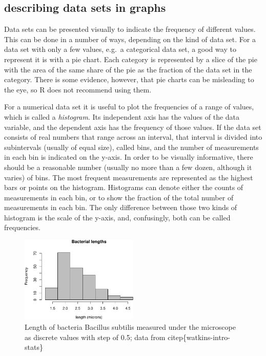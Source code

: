 \documentclass[
  letterpaper,
  DIV=11,
  numbers=noendperiod]{scrreprt}
\begin{document}
\hypertarget{describing-data-sets-in-graphs}{%
\subsection{describing data sets in
graphs}\label{describing-data-sets-in-graphs}}

Data sets can be presented visually to indicate the frequency of
different values. This can be done in a number of ways, depending on the
kind of data set. For a data set with only a few values, e.g.~a
categorical data set, a good way to represent it is with a pie chart.
Each category is represented by a slice of the pie with the area of the
same share of the pie as the fraction of the data set in the category.
There is some evidence, however, that pie charts can be misleading to
the eye, so R does not recommend using them.

For a numerical data set it is useful to plot the frequencies of a range
of values, which is called a 
\emph{histogram}. Its independent axis has the values of the data
variable, and the dependent axis has the frequency of those values. If
the data set consists of real numbers that range across an interval,
that interval is divided into subintervals (usually of equal size),
called bins, and the number of measurements in each bin is indicated on
the y-axis. In order to be visually informative, there should be a
reasonable number (usually no more than a few dozen, although it varies)
of bins. The most frequent measurements are represented as the highest
bars or points on the histogram. Histograms can denote either the counts
of measurements in each bin, or to show the fraction of the total number
of measurements in each bin. The only difference between those two kinds
of histogram is the scale of the y-axis, and, confusingly, both can be
called frequencies.

\begin{figure}

{\centering \includegraphics[width=0.5\textwidth,height=\textheight]{./descriptive_files/figure-pdf/fig-ch3-bacillus-1.pdf}

}

\caption{\label{fig-ch3-bacillus}Length of bacteria Bacillus subtilis
measured under the microscope as discrete values with step of 0.5; data
from citep\{watkins-intro-stats\}}

\end{figure}
\end{document}

